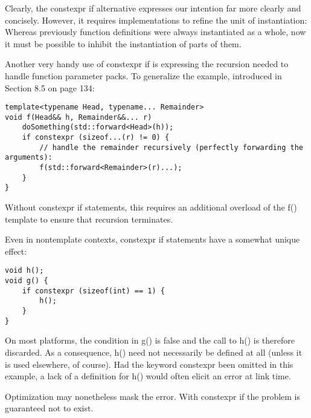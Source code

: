 Clearly, the constexpr if alternative expresses our intention far more clearly and concisely. However, it requires implementations to refine the unit of instantiation: Whereas previously function definitions were always instantiated as a whole, now it must be possible to inhibit the instantiation of parts of them.

Another very handy use of constexpr if is expressing the recursion needed to handle function parameter packs. To generalize the example, introduced in Section 8.5 on page 134:

\begin{lstlisting}[style=styleCXX]
template<typename Head, typename... Remainder>
void f(Head&& h, Remainder&&... r) 
	doSomething(std::forward<Head>(h));
	if constexpr (sizeof...(r) != 0) {
		// handle the remainder recursively (perfectly forwarding the arguments):
		f(std::forward<Remainder>(r)...);
	}
}
\end{lstlisting}

Without constexpr if statements, this requires an additional overload of the f() template to ensure that recursion terminates.

Even in nontemplate contexts, constexpr if statements have a somewhat unique effect:

\begin{lstlisting}[style=styleCXX]
void h();
void g() {
	if constexpr (sizeof(int) == 1) {
		h();
	}
}
\end{lstlisting}

On most platforms, the condition in g() is false and the call to h() is therefore discarded. As a consequence, h() need not necessarily be defined at all (unless it is used elsewhere, of course). Had the keyword constexpr been omitted in this example, a lack of a definition for h() would often elicit an error at link time.

\begin{tcolorbox}[colback=webgreen!5!white,colframe=webgreen!75!black]
\hspace*{0.75cm}Optimization may nonetheless mask the error. With constexpr if the problem is guaranteed not to exist.
\end{tcolorbox}
























